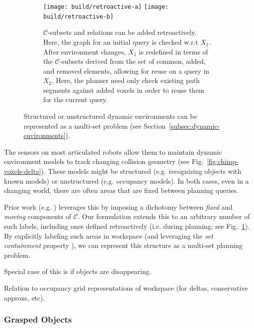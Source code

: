 \begin{figure}
\vspace{0.1in}

\begin{subfigure}[b]{\linewidth}
\centering
\texttt{[image: build/retroactive-a]}
\texttt{[image: build/retroactive-b]}
\caption{
  $\mathcal{C}$-subsets and relations
  can be added retroactively.
  Here, the graph for an initial query is checked w.r.t $X_1$.
  After environment changes,
  $X_1$ is redefined in terms of the $\mathcal{C}$-subsets
  derived from the set of common, added, and removed elements,
  allowing for reuse on a query in $X_2$.
  Here,
  the planner need only check existing path segments
  against added voxels in order to reuse them for the current query.}
\label{fig:retroactive}
\end{subfigure}

\caption{
  Structured or unstructured dynamic environments
  can be represented as a multi-set problem
  (see Section~\ref{subsec:dynamic-environments}).}
\label{fig:dynamic-environments}
\end{figure}

The sensors on most articulated robots allow them to maintain
dynamic environment models to track changing collision geometry
(see Fig.~\ref{fig:chimp-voxels-delta}).
These models might be
structured (e.g. recognizing objects with known models)
or unstructured (e.g. occupancy models).
In both cases,
even in a changing world,
there are often areas that are fixed between planning queries.

Prior work (e.g. \cite{jaillet2004dynamicprm})
leverages this by imposing a dichotomy between
\emph{fixed} and \emph{moving} components of $\mathcal{C}$.
Our formulation extends this to an arbitrary number of such labels,
including ones defined retroactively (i.e. during planning;
see Fig.~\ref{fig:retroactive}).
By explicitly labeling such areas in workspace
(and leveraging the \emph{set containment} property
\cite{newmanbranicky1991cspacetransforms}),
we can represent this structure as a multi-set planning problem.

Special case of this is if objects are disappearing.

Relation to occupancy grid representations of workspace
(for deltas, conservative approxs, etc).

\subsubsection*{Grasped Objects}
\label{subsec:grasped-objects}

